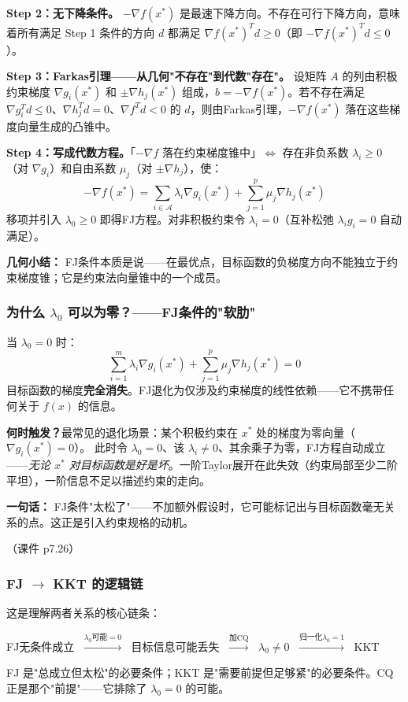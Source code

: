 \textbf{Step 2：无下降条件。} $-\nabla f(x^*)$ 是最速下降方向。不存在可行下降方向，意味着所有满足 Step 1 条件的方向 $d$ 都满足 $\nabla f(x^*)^T d \ge 0$（即 $-\nabla f(x^*)^T d \le 0$）。

\textbf{Step 3：Farkas引理——从几何"不存在"到代数"存在"。} 设矩阵 $A$ 的列由积极约束梯度 $\nabla g_i(x^*)$ 和 $\pm\nabla h_j(x^*)$ 组成，$b=-\nabla f(x^*)$。若不存在满足 $\nabla g_i^T d\le0$、$\nabla h_j^T d=0$、$\nabla f^T d<0$ 的 $d$，则由Farkas引理，$-\nabla f(x^*)$ 落在这些梯度向量生成的凸锥中。

\textbf{Step 4：写成代数方程。}「$-\nabla f$ 落在约束梯度锥中」$\Longleftrightarrow$ 存在非负系数 $\lambda_i\ge0$（对 $\nabla g_i$）和自由系数 $\mu_j$（对 $\pm\nabla h_j$），使：
\[
-\nabla f(x^*) = \sum_{i\in\mathcal{A}} \lambda_i \nabla g_i(x^*) + \sum_{j=1}^p \mu_j \nabla h_j(x^*)
\]
移项并引入 $\lambda_0\ge0$ 即得FJ方程。对非积极约束令 $\lambda_i=0$（互补松弛 $\lambda_i g_i=0$ 自动满足）。

\textbf{几何小结：} FJ条件本质是说——在最优点，目标函数的负梯度方向不能独立于约束梯度锥；它是约束法向量锥中的一个成员。

\subsubsection{为什么 $\lambda_0$ 可以为零？——FJ条件的"软肋"}

当 $\lambda_0=0$ 时：
\[
\sum_{i=1}^m \lambda_i \nabla g_i(x^*) + \sum_{j=1}^p \mu_j \nabla h_j(x^*) = 0
\]
目标函数的梯度\textbf{完全消失}。FJ退化为仅涉及约束梯度的线性依赖——它不携带任何关于 $f(x)$ 的信息。

\textbf{何时触发？}最常见的退化场景：某个积极约束在 $x^*$ 处的梯度为零向量（$\nabla g_i(x^*)=0$）。
此时令 $\lambda_0=0$、该 $\lambda_i\neq0$、其余乘子为零，FJ方程自动成立——\emph{无论 $x^*$ 对目标函数是好是坏}。一阶Taylor展开在此失效（约束局部至少二阶平坦），一阶信息不足以描述约束的走向。

\textbf{一句话：} FJ条件"太松了"——不加额外假设时，它可能标记出与目标函数毫无关系的点。这正是引入约束规格的动机。

（课件 p7.26）

\subsubsection{FJ $\to$ KKT 的逻辑链}

这是理解两者关系的核心链条：
\begin{center}
FJ无条件成立
$\;\xrightarrow{\lambda_0\text{可能}=0}\;$
目标信息可能丢失
$\;\xrightarrow{\text{加CQ}}\;$
$\lambda_0\neq 0$
$\;\xrightarrow{\text{归一化}\lambda_0=1}\;$
KKT
\end{center}
FJ 是"总成立但太松"的必要条件；KKT 是"需要前提但足够紧"的必要条件。CQ 正是那个"前提"——它排除了 $\lambda_0=0$ 的可能。

